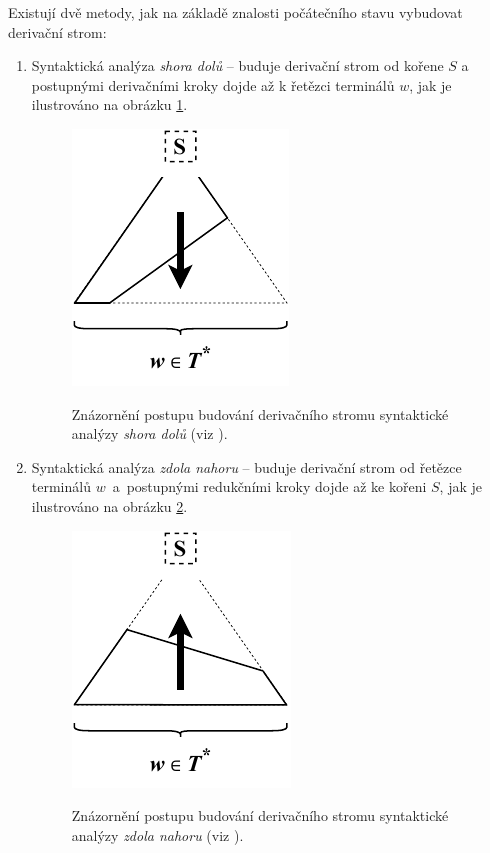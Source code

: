 Existují dvě metody, jak na základě znalosti počátečního stavu vybudovat derivační strom:
\begin{enumerate}
  \item {Syntaktická analýza \emph{shora dolů} -- buduje derivační strom od kořene $S$ a postupnými derivačními kroky dojde až k řetězci terminálů $w$, jak je ilustrováno na obrázku \ref{obrSAShoraDolu}.
        \begin{figure}[h]\centering
          \centering
          \includegraphics[scale=1.1]{obrazky/SAShoraDolu.pdf}\\[1pt]
          \caption{Znázornění postupu budování derivačního stromu syntaktické analýzy \emph{shora dolů} (viz \cite{Meduna:2000:AutomataAndLanguages}).}
          \label{obrSAShoraDolu}
        \end{figure}
  }
  \item {Syntaktická analýza \emph{zdola nahoru} -- buduje derivační strom od řetězce terminálů $w$~a~postupnými redukčními kroky dojde až ke kořeni $S$, jak je ilustrováno na obrázku \ref{obrSAZdolaNahoru}.
        \begin{figure}[h]\centering
          \centering
          \includegraphics[scale=1.1]{obrazky/SAZdolaNahoru.pdf}\\[1pt]
          \caption{Znázornění postupu budování derivačního stromu syntaktické analýzy \emph{zdola nahoru} (viz \cite{Meduna:2000:AutomataAndLanguages}).}
          \label{obrSAZdolaNahoru}
        \end{figure}
  }
\end{enumerate}

